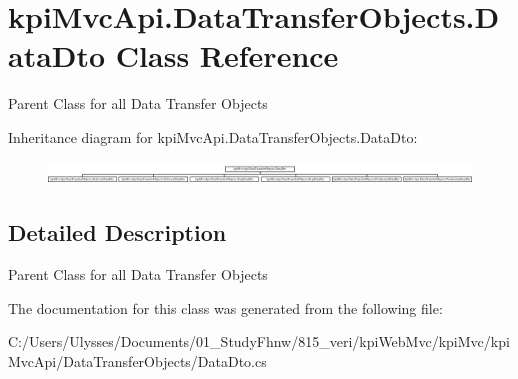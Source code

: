 \hypertarget{classkpi_mvc_api_1_1_data_transfer_objects_1_1_data_dto}{}\section{kpi\+Mvc\+Api.\+Data\+Transfer\+Objects.\+Data\+Dto Class Reference}
\label{classkpi_mvc_api_1_1_data_transfer_objects_1_1_data_dto}


Parent Class for all Data Transfer Objects  


Inheritance diagram for kpi\+Mvc\+Api.\+Data\+Transfer\+Objects.\+Data\+Dto\+:\begin{figure}[H]
\begin{center}
\leavevmode
\includegraphics[height=0.600214cm]{classkpi_mvc_api_1_1_data_transfer_objects_1_1_data_dto}
\end{center}
\end{figure}


\subsection{Detailed Description}
Parent Class for all Data Transfer Objects 



The documentation for this class was generated from the following file\+:\begin{DoxyCompactItemize}
\item 
C\+:/\+Users/\+Ulysses/\+Documents/01\+\_\+\+Study\+Fhnw/815\+\_\+veri/kpi\+Web\+Mvc/kpi\+Mvc/kpi\+Mvc\+Api/\+Data\+Transfer\+Objects/Data\+Dto.\+cs\end{DoxyCompactItemize}

